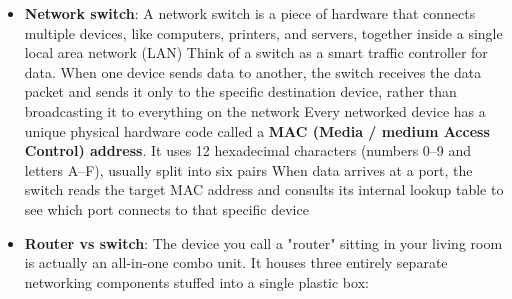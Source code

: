 \documentclass{report}
\begin{document}
\begin{itemize}
\begin{itemize}
                \item \textbf{The Modem:} The modem takes the digital data, modulates it into a signal suitable for the line, and pushes it out of your house.
                \item \textbf{The ISP:} The ISP receives the signal, demodulates it back into digital data, and routes it across the global internet infrastructure.
                \item \textbf{The Destination:} The data arrives at the destination server (the website or app you are trying to reach).
            \end{itemize}
            If you have a router with no modem, your local devices can still talk to each other, but you will not have an internet connection. Because a router lacks the ability to translate signals for an Internet Service Provider (ISP), it cannot connect your home to the outside world on its own.
            \bigbreak \noindent 
            A router's primary job is actually to manage that local network (known as a Local Area Network or LAN).
            \bigbreak \noindent 
            The router keeps track of every device in your house by giving each one a unique local IP address (like 192.168.1.5). Because it has this map of your home, it can route data directly between your phone, your laptop, and your smart TV without ever needing to involve a modem or the internet.
            \bigbreak \noindent 
            So, the modem is just one of the things a router can route to.
        \item \textbf{Network switch}: A network switch is a piece of hardware that connects multiple devices, like computers, printers, and servers, together inside a single local area network (LAN)
            \bigbreak \noindent 
            Think of a switch as a smart traffic controller for data. When one device sends data to another, the switch receives the data packet and sends it only to the specific destination device, rather than broadcasting it to everything on the network
            \bigbreak \noindent 
            Every networked device has a unique physical hardware code called a \textbf{MAC (Media / medium Access Control) address}. It uses 12 hexadecimal characters (numbers 0–9 and letters A–F), usually split into six pairs
            \bigbreak \noindent 
            When data arrives at a port, the switch reads the target MAC address and consults its internal lookup table to see which port connects to that specific device
        \item \textbf{Router vs switch}: The device you call a "router" sitting in your living room is actually an all-in-one combo unit. It houses three entirely separate networking components stuffed into a single plastic box:

\end{itemize}
\end{document}
